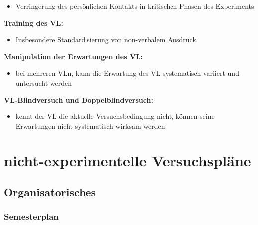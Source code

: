 \documentclass[
]{book}
\providecommand{\tightlist}{%
  \setlength{\itemsep}{0pt}\setlength{\parskip}{0pt}}
\begin{document}
\begin{itemize}
\tightlist
\item
  Verringerung des persönlichen Kontakts in kritischen Phasen des Experiments
\end{itemize}

\textbf{Training des VL:}

\begin{itemize}
\tightlist
\item
  Insbesondere Standardisierung von non-verbalem Ausdruck
\end{itemize}

\textbf{Manipulation der Erwartungen des VL:}

\begin{itemize}
\tightlist
\item
  bei mehreren VLn, kann die Erwartung des VL systematisch variiert und untersucht werden
\end{itemize}

\textbf{VL-Blindversuch und Doppelblindversuch:}

\begin{itemize}
\tightlist
\item
  kennt der VL die aktuelle Versuchsbedingung nicht, können seine Erwartungen nicht systematisch wirksam werden
\end{itemize}

\hypertarget{nicht-experimentelle-versuchspluxe4ne}{%
\chapter{nicht-experimentelle Versuchspläne}\label{nicht-experimentelle-versuchspluxe4ne}}

\hypertarget{organisatorisches-7}{%
\section{Organisatorisches}\label{organisatorisches-7}}

\hypertarget{semesterplan-8}{%
\subsection{Semesterplan}\label{semesterplan-8}}
\end{document}
